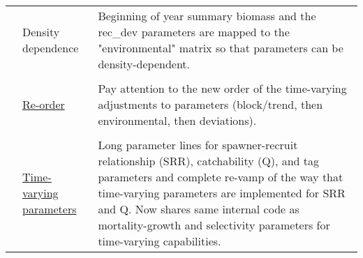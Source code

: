 \documentclass[12pt]{article}
\begin{document}
\begin{center}
\begin{longtable}{p{2cm} p{3cm} p{10cm}}
	& Density dependence & 
	Beginning of year summary biomass and the rec\_dev parameters are mapped to the "environmental" matrix so that parameters can be density-dependent.\\
	\\						
	& \hyperlink{tvOrder}{Re-order} & 
	Pay attention to the new order of the time-varying adjustments to parameters (block/trend, then environmental, then deviations). \\
	\\						
	& \hyperlink{time-vary}{Time-varying parameters} & 
	Long parameter lines for spawner-recruit relationship (SRR), catchability (Q), and tag parameters and complete re-vamp of the way that time-varying parameters are implemented for SRR and Q.  Now shares same internal code as mortality-growth and selectivity parameters for time-varying capabilities.\\
	\hline	
	\end{longtable}
\end{center}


%		
%		
%		
		
		
\end{document}
